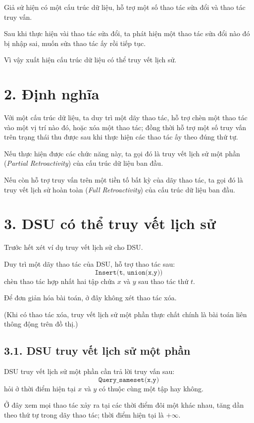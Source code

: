 \documentclass[11pt]{article}
\begin{document}
Giả sử hiện có một cấu trúc dữ liệu, hỗ trợ một số thao tác sửa đổi và thao
tác truy vấn.

Sau khi thực hiện vài thao tác sửa đổi, ta phát hiện một thao tác sửa đổi
nào đó bị nhập sai, muốn sửa thao tác ấy rồi tiếp tục.

Vì vậy xuất hiện cấu trúc dữ liệu có thể truy vết lịch sử.

\section*{2. Định nghĩa}

Với một cấu trúc dữ liệu, ta duy trì một dãy thao tác, hỗ trợ chèn một thao
tác vào một vị trí nào đó, hoặc xóa một thao tác; đồng thời hỗ trợ một số
truy vấn trên trạng thái thu được sau khi thực hiện các thao tác ấy theo đúng
thứ tự.

Nếu thực hiện được các chức năng này, ta gọi đó là truy vết lịch sử một phần
(\emph{Partial Retroactivity}) của cấu trúc dữ liệu ban đầu.

Nếu còn hỗ trợ truy vấn trên một tiền tố bất kỳ của dãy thao tác, ta gọi đó là
truy vết lịch sử hoàn toàn (\emph{Full Retroactivity}) của cấu trúc dữ liệu
ban đầu.

\section*{3. DSU có thể truy vết lịch sử}

Trước hết xét ví dụ truy vết lịch sử cho DSU.

Duy trì một dãy thao tác của DSU, hỗ trợ thao tác sau:
\[
\texttt{Insert(t, union(x,y))}
\]
chèn thao tác hợp nhất hai tập chứa \(x\) và \(y\) sau thao tác thứ \(t\).

Để đơn giản hóa bài toán, ở đây không xét thao tác xóa.

(Khi có thao tác xóa, truy vết lịch sử một phần thực chất chính là bài toán
liên thông động trên đồ thị.)

\subsection*{3.1. DSU truy vết lịch sử một phần}

DSU truy vết lịch sử một phần cần trả lời truy vấn sau:
\[
\texttt{Query\_sameset(x,y)}
\]
hỏi ở thời điểm hiện tại \(x\) và \(y\) có thuộc cùng một tập hay không.

Ở đây xem mọi thao tác xảy ra tại các thời điểm đôi một khác nhau, tăng dần
theo thứ tự trong dãy thao tác; thời điểm hiện tại là \(+\infty\).
\end{document}
